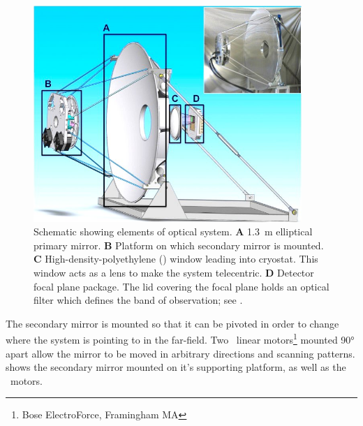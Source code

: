 \begin{figure}
\centering
\includegraphics[width=4in]{images/optics-labeled-fixed.jpg}
\caption[Schematic showing elements of optical system]{
Schematic showing elements of optical system.
\textbf{A} \SI{1.3}{\m} elliptical primary mirror.
\textbf{B} Platform on which secondary mirror is mounted.
\textbf{C} High-density-polyethylene (\HDPE) window leading into cryostat.
           This window acts as a lens to make the system telecentric.
\textbf{D} Detector focal plane package.
           The lid covering the focal plane holds an optical filter which defines the band of observation; see .
}
\label{fig:ch4-optical-schematic}
\end{figure}

The secondary mirror is mounted so that it can be pivoted in order to change where the system is pointing to in the far-field.
Two \BOSE\ linear motors\footnote{Bose ElectroForce, Framingham MA} mounted \ang{90} apart allow the mirror to be moved in arbitrary directions and scanning patterns.
 shows the secondary mirror mounted on it's supporting platform, as well as the \BOSE\ motors.

